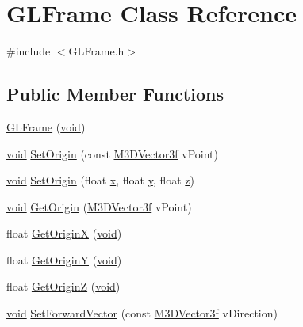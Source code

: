\hypertarget{class_g_l_frame}{\section{G\-L\-Frame Class Reference}
\label{class_g_l_frame}
}


{\ttfamily \#include $<$G\-L\-Frame.\-h$>$}

\subsection*{Public Member Functions}
\begin{DoxyCompactItemize}
\item 
\hyperlink{class_g_l_frame_a1d4acac2c9bbb36558336316e22fe6d6}{G\-L\-Frame} (\hyperlink{_s_d_l__opengl_8h_a3db05964a3cc4410f35b7ea2b7eb850d}{void})
\item 
\hyperlink{_s_d_l__opengl_8h_a3db05964a3cc4410f35b7ea2b7eb850d}{void} \hyperlink{class_g_l_frame_ac62cf46cd55c4a9b1604b22473615b19}{Set\-Origin} (const \hyperlink{math3d_8h_a2163fe22bd4208b846d22ec7e74cf858}{M3\-D\-Vector3f} v\-Point)
\item 
\hyperlink{_s_d_l__opengl_8h_a3db05964a3cc4410f35b7ea2b7eb850d}{void} \hyperlink{class_g_l_frame_a98384483778094411037c647c76d5c5f}{Set\-Origin} (float \hyperlink{_g_l_e_w_2glew_8h_a0cdec8e97a75ee9458b23d152bf962d4}{x}, float \hyperlink{_g_l_e_w_2glew_8h_a74d80fd479c0f6d0153c709949a089ef}{y}, float \hyperlink{_g_l_e_w_2glew_8h_aee38b51639b577753f6a92029fb92000}{z})
\item 
\hyperlink{_s_d_l__opengl_8h_a3db05964a3cc4410f35b7ea2b7eb850d}{void} \hyperlink{class_g_l_frame_af69f2f8583e518eed8372ea8b06317e4}{Get\-Origin} (\hyperlink{math3d_8h_a2163fe22bd4208b846d22ec7e74cf858}{M3\-D\-Vector3f} v\-Point)
\item 
float \hyperlink{class_g_l_frame_a4678002e7fa01aab840491c6b3e23275}{Get\-Origin\-X} (\hyperlink{_s_d_l__opengl_8h_a3db05964a3cc4410f35b7ea2b7eb850d}{void})
\item 
float \hyperlink{class_g_l_frame_a144f14bb264ad79b9c3815b022f69c7d}{Get\-Origin\-Y} (\hyperlink{_s_d_l__opengl_8h_a3db05964a3cc4410f35b7ea2b7eb850d}{void})
\item 
float \hyperlink{class_g_l_frame_a7b187e9ac07376e2aeb56827e1c6aece}{Get\-Origin\-Z} (\hyperlink{_s_d_l__opengl_8h_a3db05964a3cc4410f35b7ea2b7eb850d}{void})
\item 
\hyperlink{_s_d_l__opengl_8h_a3db05964a3cc4410f35b7ea2b7eb850d}{void} \hyperlink{class_g_l_frame_a16f058bdf690a6ddd65469dc5a84df11}{Set\-Forward\-Vector} (const \hyperlink{math3d_8h_a2163fe22bd4208b846d22ec7e74cf858}{M3\-D\-Vector3f} v\-Direction)

\end{DoxyCompactItemize}
